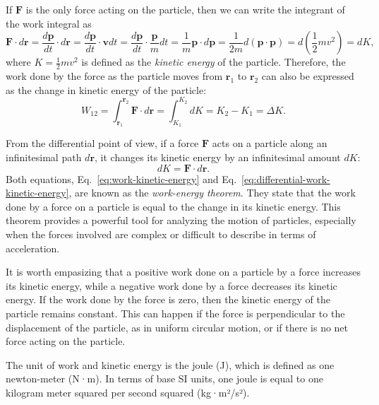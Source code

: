 \documentclass[../main.tex]{subfiles}
\begin{document}
If $\mathbf{F}$ is the only force acting on the particle, then we can write the integrant of the work integral as
\begin{equation}
    \mathbf{F}\cdot d\mathbf{r} = \frac{d\mathbf{p}}{dt}\cdot d\mathbf{r} = \frac{d\mathbf{p}}{dt}\cdot \mathbf{v} dt = \frac{d\mathbf{p}}{dt}\cdot \frac{\mathbf{p}}{m} dt = \frac{1}{m}\mathbf{p}\cdot d\mathbf{p} = \frac{1}{2m} d(\mathbf{p}\cdot\mathbf{p}) = d\left(\frac{1}{2} m v^2\right) = dK,
\end{equation}
where $K = \frac{1}{2} m v^2$ is defined as the \emph{kinetic energy} of the particle. Therefore, the work done by the force as the particle moves from $\mathbf{r}_1$ to $\mathbf{r}_2$ can also be expressed as the change in kinetic energy of the particle:
\begin{equation}
    W_{12} = \int_{\mathbf{r}_1}^{\mathbf{r}_2} \mathbf{F}\cdot d\mathbf{r} = \int_{K_1}^{K_2} dK = K_2 - K_1 = \Delta K.
    \label{eq:work-kinetic-energy}
\end{equation}

From the differential point of view, if a force $\mathbf{F}$ acts on a particle along an infinitesimal path $d\mathbf{r}$, it changes its kinetic energy by an infinitesimal amount $dK$:
\begin{equation}
    dK = \mathbf{F}\cdot d\mathbf{r}.
    \label{eq:differential-work-kinetic-energy}
\end{equation}
Both equations, Eq.~\eqref{eq:work-kinetic-energy} and Eq.~\eqref{eq:differential-work-kinetic-energy}, are known as the \emph{work-energy theorem}. They state that the work done by a force on a particle is equal to the change in its kinetic energy. This theorem provides a powerful tool for analyzing the motion of particles, especially when the forces involved are complex or difficult to describe in terms of acceleration.

It is worth empasizing that a positive work done on a particle by a force increases its kinetic energy, while a negative work done by a force decreases its kinetic energy. If the work done by the force is zero, then the kinetic energy of the particle remains constant. This can happen if the force is perpendicular to the displacement of the particle, as in uniform circular motion, or if there is no net force acting on the particle.

The unit of work and kinetic energy is the joule (J), which is defined as one newton-meter (N·m). In terms of base SI units, one joule is equal to one kilogram meter squared per second squared (kg·m²/s²).
\end{document}
